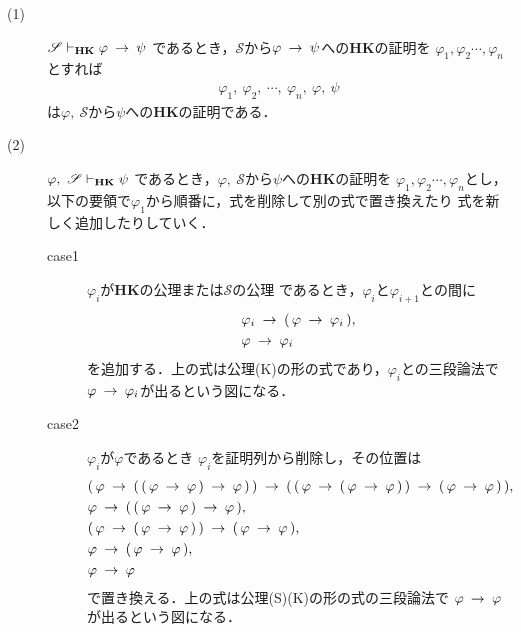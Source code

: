 	\begin{metaprf}\mbox{}
		\begin{description}
			\item[(1)] $\mathscr{S} \vdash_{{\scriptsize \mbox{{\bf HK}}}} \varphi \hspace{0.25em}\rightarrow\hspace{0.25em} \psi$
				であるとき，$\mathscr{S}$から$\varphi \hspace{0.25em}\rightarrow\hspace{0.25em} \psi$への{\bf HK}の証明を
				$\varphi_{1},\varphi_{2}\cdots,\varphi_{n}$とすれば
				\begin{align}
					\varphi_{1},\ \varphi_{2},\ \cdots,\ \varphi_{n},\ \varphi,\ \psi
				\end{align}
				は$\varphi,\ \mathscr{S}$から$\psi$への{\bf HK}の証明である．
				
			\item[(2)] $\varphi,\ \mathscr{S} \vdash_{{\scriptsize \mbox{{\bf HK}}}} \psi$
				であるとき，$\varphi,\ \mathscr{S}$から$\psi$への{\bf HK}の証明を
				$\varphi_{1},\varphi_{2}\cdots,\varphi_{n}$とし，
				以下の要領で$\varphi_{1}$から順番に，式を削除して別の式で置き換えたり
				式を新しく追加したりしていく．
				\begin{description}
					\item[case1] $\varphi_{i}$が{\bf HK}の公理または$\mathscr{S}$の公理
						であるとき，$\varphi_{i}$と$\varphi_{i+1}$との間に
						\begin{align}
							&\varphi_{i} \hspace{0.25em}\rightarrow\hspace{0.25em} (\, \varphi \hspace{0.25em}\rightarrow\hspace{0.25em} \varphi_{i}\, ), \\
							&\varphi \hspace{0.25em}\rightarrow\hspace{0.25em} \varphi_{i}
						\end{align}
						を追加する．上の式は公理(K)の形の式であり，$\varphi_{i}$との三段論法で
						$\varphi \hspace{0.25em}\rightarrow\hspace{0.25em} \varphi_{i}$が出るという図になる．
						
					\item[case2] $\varphi_{i}$が$\varphi$であるとき
						$\varphi_{i}$を証明列から削除し，その位置は
						\begin{align}
							&(\, \varphi \hspace{0.25em}\rightarrow\hspace{0.25em} (\, (\, \varphi \hspace{0.25em}\rightarrow\hspace{0.25em} \varphi\, )
								\hspace{0.25em}\rightarrow\hspace{0.25em} \varphi\, )\, )
								\hspace{0.25em}\rightarrow\hspace{0.25em} (\, (\, \varphi \hspace{0.25em}\rightarrow\hspace{0.25em} 
								(\, \varphi \hspace{0.25em}\rightarrow\hspace{0.25em} \varphi\, )\, )
								\hspace{0.25em}\rightarrow\hspace{0.25em} (\, \varphi \hspace{0.25em}\rightarrow\hspace{0.25em} \varphi\, )\, ), \\
							&\varphi \hspace{0.25em}\rightarrow\hspace{0.25em} (\, (\, \varphi \hspace{0.25em}\rightarrow\hspace{0.25em} \varphi\, )
								\hspace{0.25em}\rightarrow\hspace{0.25em} \varphi\, ), \\
							&(\, \varphi \hspace{0.25em}\rightarrow\hspace{0.25em} 
								(\, \varphi \hspace{0.25em}\rightarrow\hspace{0.25em} \varphi\, )\, )
								\hspace{0.25em}\rightarrow\hspace{0.25em} (\, \varphi \hspace{0.25em}\rightarrow\hspace{0.25em} \varphi\, ), \\
							&\varphi \hspace{0.25em}\rightarrow\hspace{0.25em} 
								(\, \varphi \hspace{0.25em}\rightarrow\hspace{0.25em} \varphi\, ), \\
							&\varphi \hspace{0.25em}\rightarrow\hspace{0.25em} \varphi
						\end{align}
						で置き換える．上の式は公理(S)(K)の形の式の三段論法で
						$\varphi \hspace{0.25em}\rightarrow\hspace{0.25em} \varphi$が出るという図になる．
						

\end{description}
\end{description}
\end{metaprf}
